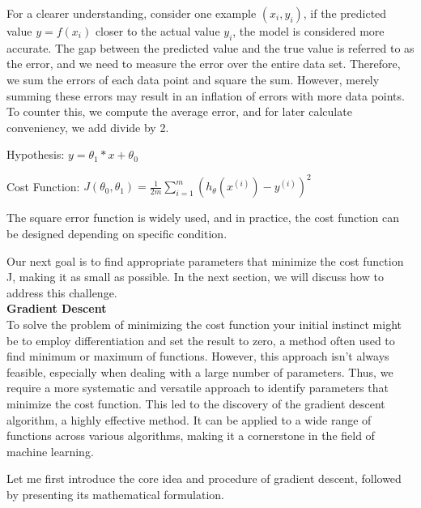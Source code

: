 \documentclass{article}
\begin{document}
     For a clearer understanding, consider one example $(x_{i}, y_{i})$,   if the predicted value $y = f(x_{i})$ closer to the actual value $y_{i}$, the model is considered more accurate. The gap between the predicted value and the true value is referred to as the error, and we need to measure the error over the entire data set. Therefore, we sum the errors of each data point and square the sum. However, merely summing these errors may result in an inflation of errors with more data points. To counter this, we compute the average error, and for later calculate conveniency, we add divide by 2.


     \hspace*{\fill}

     Hypothesis:
     $ y = \theta_{1} * x  + \theta_{0}$
     \hspace*{\fill}

     \hspace*{\fill}

     Cost Function:
     $J\left(\theta_0, \theta_1\right)=\frac{1}{2 m} \sum_{i=1}^m\left(h_\theta\left(x^{(i)}\right)-y^{(i)}\right)^2$

     \hspace*{\fill}

     The square error function is widely used, and in practice, the cost function can be designed depending on specific condition.

    Our next goal is to find appropriate parameters that minimize the cost function J, making it as small as possible. In the next section, we will discuss how to address this challenge.\\


    \noindent
    \textbf{Gradient Descent}\\
    \noindent
    To solve the problem of minimizing the cost function your initial instinct might be to employ differentiation and set the result to zero, a method often used to find minimum or maximum of functions. However, this approach isn't always feasible, especially when dealing with a large number of parameters. Thus, we require a more systematic and versatile approach to identify parameters that minimize the cost function. This led to the discovery of the gradient descent algorithm, a highly effective method. It can be applied to a wide range of functions across various algorithms, making it a cornerstone in the field of machine learning.

Let me first introduce the core idea and procedure of gradient descent, followed by presenting its mathematical formulation.
\end{document}
